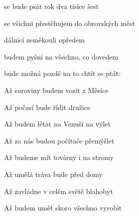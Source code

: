 

\zs
{} se bude psát rok dva tisíce šest

 se všichni přestěhujem do obrovských měst

 dálnicí zeměkouli opředem

 budem pyšni na všechno, co dovedem
\ks

\zr
{} bude možná pozdě na to chtít se ptát:

\kr

\zs
Až suroviny budem vozit z Měsíce

Až počasí bude řídit družice

Až budem létat na Venuši na výlet

Až za nás budou počítače přemýšlet
\ks

\zr  \kr

\zs
Až budeme mít továrny i na stromy

Až umělá tráva bude před domy

Až zavládne v celém světě blahobyt

Až budem umět skoro všechno vyrobit
\ks

\zr  \kr

\kp























